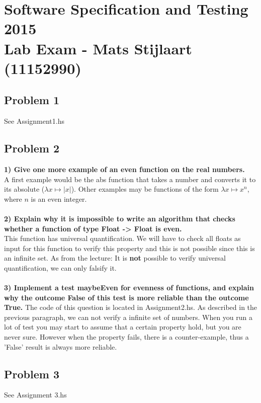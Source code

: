 \section*{Software Specification and Testing 2015 \\ Lab Exam - Mats Stijlaart (11152990)}

\subsection*{Problem 1}

See Assignment1.hs

\subsection*{Problem 2}

\textbf{1) Give one more example of an even function on the real numbers.}\\

\noindent
A first example would be the abs function that takes a number and converts it to its absolute ($\lambda x \mapsto |x|$).
Other examples may be functions of the form $\lambda x \mapsto x^n$, where $n$ is an even integer. \\
\\
\noindent
\textbf{2) Explain why it is impossible to write an algorithm that checks whether a function of type Float -> Float is even.}\\
This function has universal quantification. We will have to check all floats as input for this function to verify this property and this is not possible since this is an infinite set.
As from the lecture: It is \textbf{not} possible to verify universal quantification, we can only falsify it. \\
\\
\noindent
\textbf{3) Implement a test maybeEven for evenness of functions, and explain why the outcome False of this test is more reliable than the outcome True.}
The code of this question is located in Assignment2.hs. As described in the previous paragraph, we can not verify a infinite set of numbers.
When you run a lot of test you may start to assume that a certain property hold, but you are never sure.
However when the property fails, there is a counter-example, thus a 'False' result is always more reliable.

\subsection*{Problem 3}

See Assignment 3.hs